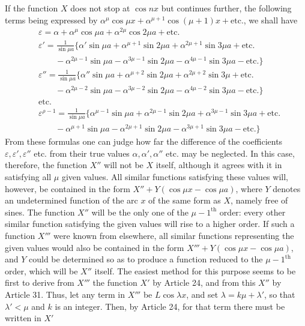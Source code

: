 If the function $X$ does not stop at $\cos nx$ but continues further, the following terms being expressed by $\alpha^\mu\cos\mu x+\alpha^{\mu+1}\cos(\mu+1)x+\text{etc.}$, we shall have
\[
\begin{aligned}
&\varepsilon=\alpha+\alpha^\mu\cos\mu a+\alpha^{2\mu}\cos2\mu a+\text{etc.}\\[5pt]
&\varepsilon'=\frac{1}{\sin\mu a}\{\alpha'\sin\mu a+\alpha^{\mu+1}\sin2\mu a+\alpha^{2\mu+1}\sin3\mu a+\text{etc.}\\[5pt]
&\qquad-\alpha^{2\mu-1}\sin\mu a-\alpha^{3\mu-1}\sin2\mu a-\alpha^{4\mu-1}\sin3\mu a-\text{etc.}\}\\[5pt]
&\varepsilon''=\frac{1}{\sin\mu a}\{\alpha''\sin\mu a+\alpha^{\mu+2}\sin2\mu a+\alpha^{2\mu+2}\sin3\mu+\text{etc.}\\[5pt]
&\qquad-\alpha^{2\mu-2}\sin\mu a-\alpha^{3\mu-2}\sin2\mu a-\alpha^{4\mu-2}\sin3\mu a-\text{etc.}\}\\[5pt]
&\text{etc.}\\[5pt]
&\varepsilon^{\rho-1}=\frac{1}{\sin\mu a}\{\alpha^{\mu-1}\sin\mu a+\alpha^{2\mu-1}\sin2\mu a+\alpha^{3\mu-1}\sin3\mu a+\text{etc.}\\[5pt]
&\qquad-\alpha^{\mu+1}\sin\mu a-\alpha^{2\mu+1}\sin2\mu a-\alpha^{3\mu+1}\sin3\mu a-\text{etc.}\}
\end{aligned}
\]
From these formulas one can judge how far the difference of the coefficients $\varepsilon,\varepsilon',\varepsilon''$ etc. from their true values $\alpha,\alpha',\alpha''$ etc. may be neglected. In this case, therefore, the function $X''$ will not be $X$ itself, although it agrees with it in satisfying all $\mu$ given values. All similar functions satisfying these values will, however, be contained in the form $X''+Y(\cos\mu x-\cos\mu a)$, where $Y$ denotes an undetermined function of the arc $x$ of the same form as $X$, namely free of sines. The function $X''$ will be the only one of the $\mu-1^{\mathrm{th}}$ order: every other similar function satisfying the given values will rise to a higher order. If such a function $X'''$ were known from elsewhere, all similar functions representing the given values would also be contained in the form $X'''+Y(\cos\mu x-\cos\mu a)$, and $Y$ could be determined so as to produce a function reduced to the $\mu-1^{\mathrm{th}}$ order, which will be $X''$ itself. The easiest method for this purpose seems to be first to derive from $X'''$ the function $X'$ by Article 24, and from this $X''$ by Article 31. Thus, let any term in $X'''$ be $L\cos\lambda x$, and set $\lambda=k\mu+\lambda'$, so that $\lambda'<\mu$ and $k$ is an integer. Then, by Article 24, for that term there must be written in $X'$
